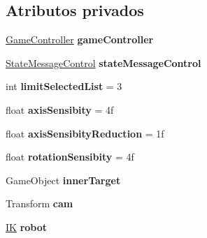 \subsection*{Atributos privados}
\begin{DoxyCompactItemize}
\item 
\mbox{\label{class_selection_control_ab58ba99d0ac60add2848b5fc809e5c3a}} 
\mbox{\hyperlink{class_game_controller}{Game\+Controller}} {\bfseries game\+Controller}
\item 
\mbox{\label{class_selection_control_aff388d8482e51dd5c41c574548e7a5f1}} 
\mbox{\hyperlink{class_state_message_control}{State\+Message\+Control}} {\bfseries state\+Message\+Control}
\item 
\mbox{\label{class_selection_control_acc82727476da9068b9d37626c3970838}} 
int {\bfseries limit\+Selected\+List} = 3
\item 
\mbox{\label{class_selection_control_ab7311557ef2c9005f364e56f05dafb71}} 
float {\bfseries axis\+Sensibity} = 4f
\item 
\mbox{\label{class_selection_control_a55cfc233f1c1b59b942e5214b2700982}} 
float {\bfseries axis\+Sensibity\+Reduction} = 1f
\item 
\mbox{\label{class_selection_control_a8a791541efa5835991e827d607f31bde}} 
float {\bfseries rotation\+Sensibity} = 4f
\item 
\mbox{\label{class_selection_control_ab9e62bdf4cd95d797fe86a3aab18fb79}} 
Game\+Object {\bfseries inner\+Target}
\item 
\mbox{\label{class_selection_control_ab4b3742c71f492fe3b364bdb57684810}} 
Transform {\bfseries cam}
\item 
\mbox{\label{class_selection_control_a5d71202bcab3b91730c9e775c73a96a9}} 
\mbox{\hyperlink{class_i_k}{IK}} {\bfseries robot}
\item 
\mbox{\label{class_selection_control_aa1fd9531f73e0052f6f1d2521928a421}} 

\end{DoxyCompactItemize}

